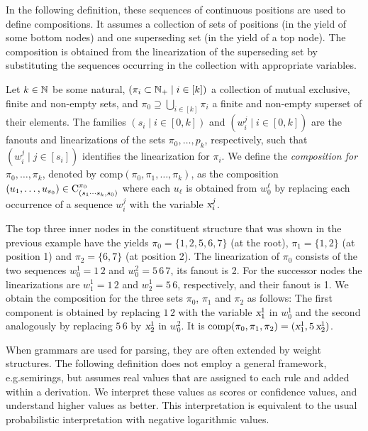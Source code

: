 \documentclass[../../document.tex]{subfiles}
\begin{document}
    In the following definition, these sequences of continuous positions are used to define  compositions.
    It assumes a collection of sets of positions (in the yield of some bottom nodes) and one superseding set (in the yield of a top node).
    The composition is obtained from the linearization of the superseding set by substituting the sequences occurring in the collection with appropriate variables.

    \begin{definition}
        Let \(k \in \mathbb{N}\) be some natural, \((\pi_i \subset \mathbb{N}_+ \mid i \in [k])\) a collection of mutual exclusive, finite and non-empty sets, and \(\pi_0 \supseteq \bigcup_{i \in [k]} \pi_i\) a finite and non-empty superset of their elements.
        The families \((s_i \mid i \in [0,k])\) and \((w_i^j \mid i \in [0,k])\) are the fanouts and linearizations of the sets \(\pi_0, \ldots, p_k\), respectively, such that \((w_i^j \mid j \in [s_i])\) identifies the linearization for \(\pi_i\).
        We define the \emph{composition for \(\pi_0, \ldots, \pi_k\)}, denoted by \(\mathrm{comp}(\pi_0, \pi_1, \ldots, \pi_k)\), as the composition \((u_1, \ldots, u_{s_0}) \in \mathrm{C}^{\pi_0}_{(s_1\cdots s_k, s_0)}\) where each \(u_\ell\) is obtained from \(w_0^\ell\) by replacing each occurrence of a sequence \(w_i^j\) with the variable \(\textsl{x}_i^j\).
    \end{definition}

    \begin{example}
        The top three inner nodes in the constituent structure that was shown in the previous example have the yields \(\pi_0 = \{1,2,5,6,7\}\) (at the root), \(\pi_1 = \{1,2\}\) (at position 1) and \(\pi_2 = \{6,7\}\) (at position 2).
        The linearization of \(\pi_0\) consists of the two sequences \(w_0^1 = 1\,2\) and \(w_0^2 = 5\,6\,7\), its fanout is 2.
        For the successor nodes the linearizations are \(w_1^1 = 1\,2\) and \(w_2^1 = 5\,6\), respectively, and their fanout is 1.
        We obtain the composition for the three sets \(\pi_0\), \(\pi_1\) and \(\pi_2\) as follows:
            The first component is obtained by replacing \(1\,2\) with the variable \(\textsl{x}_1^1\) in \(w_0^1\) and the second analogously by replacing \(5\,6\) by \(\textsl{x}_2^1\) in \(w_0^2\).
        It is \(\mathrm{comp}(\pi_0, \pi_1, \pi_2) = (\textsl{x}_1^1, 5\,\textsl{x}_2^1)\).
    \end{example}

    When grammars are used for parsing, they are often extended by weight structures.
    The following definition does not employ a general framework, e.g.\@ semirings, but assumes real values that are assigned to each rule and added within a derivation.
    We interpret these values as scores or confidence values, and understand higher values as better.
    This interpretation is equivalent to the usual probabilistic interpretation \citep[Viterbi semiring]{Goodman} with negative logarithmic values.
\end{document}
